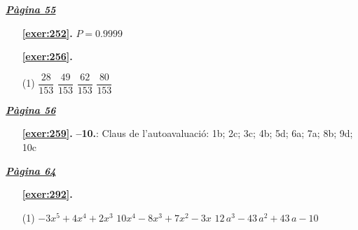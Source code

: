 
\hyperlink{page.55}{\textbf{\em Pàgina 55}}
\begin{enumerate}
\item[\fontfamily{phv}\selectfont\color{blue}\textbf{\ref{exer:252}. }] \label{ans:252} 
$P=0.9999$
 \end{enumerate}
\begin{enumerate}



 \item[\fontfamily{phv}\selectfont\color{blue}\textbf{\ref{exer:256}. }] \label{ans:256}
 \begin{tasks}[column-sep=1em, item-indent=1.3333em](1)
	 \task $\dfrac {28}{153}$
	 \task $\dfrac {49}{153}$
	 \task $\dfrac {62}{153}$
	 \task $\dfrac {80}{153}$
\end{tasks}
 \end{enumerate}
\vspace{0.3cm}


\hyperlink{page.56}{\textbf{\em Pàgina 56}}
\begin{enumerate}
\item[\fontfamily{phv}\selectfont\color{blue}\textbf{\ref{exer:259}. }] \label{ans:259} 
\textbf {--10.}: Claus de l'autoavaluació: 1b; 2c; 3c; 4b; 5d; 6a; 7a; 8b; 9d; 10c
 \end{enumerate}

 \vspace{1cm} 
 

\vspace{0.3cm}


\hyperlink{page.64}{\textbf{\em Pàgina 64}}
\begin{enumerate}



 \item[\fontfamily{phv}\selectfont\color{blue}\textbf{\ref{exer:292}. }] \label{ans:292}
 \begin{tasks}[column-sep=1em, item-indent=1.3333em](1)
	 \task $-3x^5+4x^4+2x^3$
	 \task $10x^4-8x^3+7x^2-3x$
	 \task $12\,a^3-43\,a^2+43\,a-10$
\end{tasks}
 \end{enumerate}
\vspace{0.3cm}

